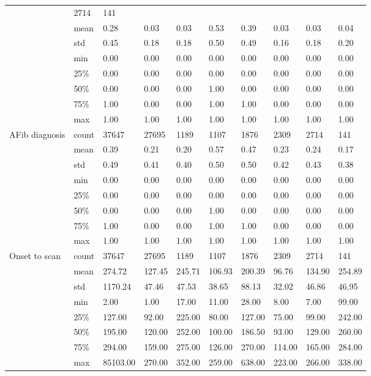\begin{landscape}
{\begin{longtable}[]{@{}llllllllll@{}}
& 2714 & 141 \\
& mean & 0.28 & 0.03 & 0.03 & 0.53 & 0.39 & 0.03 & 0.03 & 0.04 \\
& std & 0.45 & 0.18 & 0.18 & 0.50 & 0.49 & 0.16 & 0.18 & 0.20 \\
& min & 0.00 & 0.00 & 0.00 & 0.00 & 0.00 & 0.00 & 0.00 & 0.00 \\
& 25\% & 0.00 & 0.00 & 0.00 & 0.00 & 0.00 & 0.00 & 0.00 & 0.00 \\
& 50\% & 0.00 & 0.00 & 0.00 & 1.00 & 0.00 & 0.00 & 0.00 & 0.00 \\
& 75\% & 1.00 & 0.00 & 0.00 & 1.00 & 1.00 & 0.00 & 0.00 & 0.00 \\
& max & 1.00 & 1.00 & 1.00 & 1.00 & 1.00 & 1.00 & 1.00 & 1.00 \\
AFib diagnosis & count & 37647 & 27695 & 1189 & 1107 & 1876 & 2309
& 2714 & 141 \\
& mean & 0.39 & 0.21 & 0.20 & 0.57 & 0.47 & 0.23 & 0.24 & 0.17 \\
& std & 0.49 & 0.41 & 0.40 & 0.50 & 0.50 & 0.42 & 0.43 & 0.38 \\
& min & 0.00 & 0.00 & 0.00 & 0.00 & 0.00 & 0.00 & 0.00 & 0.00 \\
& 25\% & 0.00 & 0.00 & 0.00 & 0.00 & 0.00 & 0.00 & 0.00 & 0.00 \\
& 50\% & 0.00 & 0.00 & 0.00 & 1.00 & 0.00 & 0.00 & 0.00 & 0.00 \\
& 75\% & 1.00 & 0.00 & 0.00 & 1.00 & 1.00 & 0.00 & 0.00 & 0.00 \\
& max & 1.00 & 1.00 & 1.00 & 1.00 & 1.00 & 1.00 & 1.00 & 1.00 \\
Onset to scan & count & 37647 & 27695 & 1189 & 1107 & 1876 & 2309 & 2714 & 141 \\
& mean & 274.72 & 127.45 & 245.71 & 106.93 & 200.39 & 96.76 & 134.90 & 254.89 \\
& std & 1170.24 & 47.46 & 47.53 & 38.65 & 88.13 & 32.02 & 46.86 & 46.95 \\
& min & 2.00 & 1.00 & 17.00 & 11.00 & 28.00 & 8.00 & 7.00 & 99.00 \\
& 25\% & 127.00 & 92.00 & 225.00 & 80.00 & 127.00 & 75.00 & 99.00 & 242.00 \\
& 50\% & 195.00 & 120.00 & 252.00 & 100.00 & 186.50 & 93.00 & 129.00 & 260.00 \\
& 75\% & 294.00 & 159.00 & 275.00 & 126.00 & 270.00 & 114.00 & 165.00 & 284.00 \\
& max & 85103.00 & 270.00 & 352.00 & 259.00 & 638.00 & 223.00 & 266.00 & 338.00 \\

\end{longtable}}
\end{landscape}
